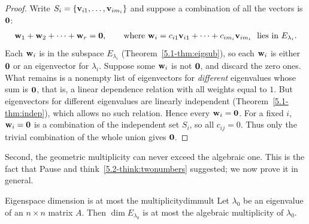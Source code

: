 \documentclass[11pt]{article}
\begin{document}
\begin{proof}
Write $S_i=\{\mathbf{v}_{i1},\dots,\mathbf{v}_{im_i}\}$ and suppose a combination of all the vectors is $\mathbf{0}$:
\[
\mathbf{w}_1+\mathbf{w}_2+\cdots+\mathbf{w}_r=\mathbf{0},\qquad\text{where }\mathbf{w}_i=c_{i1}\mathbf{v}_{i1}+\cdots+c_{im_i}\mathbf{v}_{im_i}\ \text{ lies in }E_{\lambda_i}.
\]
Each $\mathbf{w}_i$ is in the subspace $E_{\lambda_i}$ (Theorem~\ref{5.1-thm:eigsub}), so each $\mathbf{w}_i$ is either $\mathbf{0}$ or an eigenvector for $\lambda_i$. Suppose some $\mathbf{w}_i$ is not $\mathbf{0}$, and discard the zero ones. What remains is a nonempty list of eigenvectors for \emph{different} eigenvalues whose sum is $\mathbf{0}$, that is, a linear dependence relation with all weights equal to $1$. But eigenvectors for different eigenvalues are linearly independent (Theorem~\ref{5.1-thm:indep}), which allows no such relation. Hence every $\mathbf{w}_i=\mathbf{0}$. For a fixed $i$, $\mathbf{w}_i=\mathbf{0}$ is a combination of the independent set $S_i$, so all $c_{ij}=0$. Thus only the trivial combination of the whole union gives $\mathbf{0}$.
\end{proof}

Second, the geometric multiplicity can never exceed the algebraic one. This is the fact that Pause and think~\ref{5.2-think:twonumbers} suggested; we now prove it in general.

\begin{thm}{Eigenspace dimension is at most the multiplicity}{dimmult}
Let $\lambda_0$ be an eigenvalue of an $n\times n$ matrix $A$. Then $\dim E_{\lambda_0}$ is at most the algebraic multiplicity of $\lambda_0$.
\end{thm}
\end{document}
